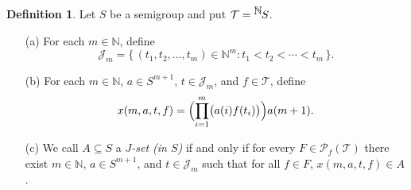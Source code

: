 \documentclass[12pt]{article}
\theoremstyle{plain}
\theoremstyle{definition}
\newtheorem{defn}[thm]{Definition}
\newcommand{\bbN}{\mathbb{N}}
\newcommand{\calJ}{\mathcal{J}}
\newcommand{\calT}{\mathcal{T}}
\newcommand{\Pf}{\mathcal{P}_f}
\newcommand{\setfunc}[2]{\hbox{${}^{\hbox{$#1$}}\hskip -1 pt #2$}}
\begin{document}
\begin{defn}
Let $S$ be a semigroup and put $\calT = \setfunc{\bbN}{S}$. 
  \begin{itemize}
    \item[(a)] For each $m \in \bbN$, define
      \[
        \calJ_m = \{\, (t_1, t_2, \ldots, t_m) \in \bbN^m : t_1 < t_2 < \cdots < t_m \,\}.
      \]

    \item[(b)] For each $m \in \bbN$, $a \in S^{m+1}$, $t \in \calJ_m$, and $f \in \calT$, define
      \[
        x(m, a, t, f) = \Bigl(\prod_{i=1}^m \bigl( a(i) f(t_i) \bigr) \Bigr) a(m+1).
      \]

    \item[(c)] We call $A \subseteq S$ a \textsl{$J$-set (in $S$)} if and only if for every $F \in \Pf(\calT)$ there exist $m \in \bbN$, $a \in S^{m+1}$, and $t \in \calJ_m$ such that for all $f \in F$, $x(m, a, t, f) \in A$.
  \end{itemize}
\end{defn}
\end{document}
